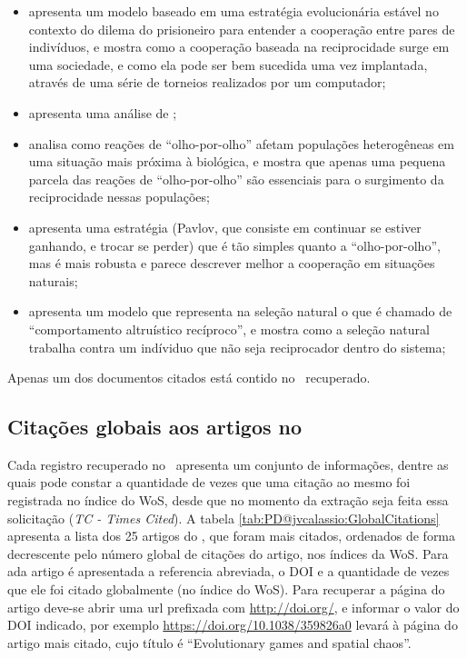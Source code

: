 \begin{itemize}
    \item \cite{axelrod_evolution_1981} apresenta um modelo baseado em uma estratégia evolucionária estável no contexto do dilema do prisioneiro para entender a cooperação entre pares de indivíduos, e mostra como a cooperação baseada na reciprocidade surge em uma sociedade, e como ela pode ser bem sucedida uma vez implantada, através de uma série de torneios realizados por um computador;
    \item \cite{greene_review_1984} apresenta uma análise de \cite{axelrod_evolution_1981};
    \item \cite{nowak_tit_1992} analisa como reações de ``olho-por-olho'' afetam populações heterogêneas em uma situação mais próxima à biológica, e mostra que apenas uma pequena parcela das reações de ``olho-por-olho'' são essenciais para o surgimento da reciprocidade nessas populações;
    \item \cite{nowak_strategy_1993} apresenta uma estratégia (Pavlov, que consiste em continuar se estiver ganhando, e trocar se perder) que é tão simples quanto a ``olho-por-olho'', mas é mais robusta e parece descrever melhor a cooperação em situações naturais;
    \item \cite{trivers_evolution_1971} apresenta um modelo que representa na seleção natural o que é chamado de ``comportamento altruístico recíproco'', e mostra como a seleção natural trabalha contra um indíviduo que não seja reciprocador dentro do sistema;
\end{itemize}

Apenas um dos documentos citados está contido no \dataset\   recuperado.

\subsection{Citações globais aos artigos no \dataset}

Cada registro recuperado no \dataset\ apresenta um conjunto de informações, dentre as quais pode constar a quantidade de vezes que uma citação ao mesmo foi registrada no índice do WoS, desde que no momento da extração seja feita essa solicitação (\textit{TC - Times Cited}).
A tabela \ref{tab:PD@jvcalassio:GlobalCitations} apresenta a lista dos 25 artigos do \dataset, que foram mais citados, ordenados de forma decrescente pelo número global de citações do artigo, nos índices da WoS. Para ada artigo é apresentada a referencia abreviada, o DOI e a quantidade de vezes que ele foi citado globalmente (no índice do WoS). Para recuperar a página do artigo deve-se abrir uma url prefixada com \url{http://doi.org/}, e informar o valor do DOI indicado, por exemplo \url{https://doi.org/10.1038/359826a0} levará à página do artigo mais citado, cujo título é ``Evolutionary games and spatial chaos''.

